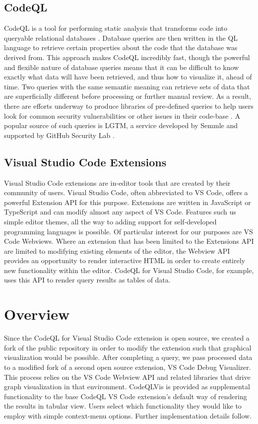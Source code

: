 \documentclass[sigplan,10pt,review]{acmart}
\begin{document}
\subsection{CodeQL}
CodeQL is a tool for performing static analysis that transforms code into queryable relational databases \cite{Semmle_CodeQL_About}. Database queries are then written in the QL language to retrieve certain properties about the code that the database was derived from. This approach makes CodeQL incredibly fast, though the powerful and flexible nature of database queries means that it can be difficult to know exactly what data will have been retrieved, and thus how to visualize it, ahead of time.
\newline
\indent Two queries with the same semantic meaning can retrieve sets of data that are superficially different before processing or further manual review. As a result, there are efforts underway to produce libraries of pre-defined queries to help users look for common security vulnerabilities or other issues in their code-base \cite{Semmle_LGTM}. A popular source of such queries is LGTM, a service developed by Semmle and supported by GitHub Security Lab \cite{GitHub_SecurtyLab_CodeQL}.

\subsection{Visual Studio Code Extensions}
Visual Studio Code extensions are in-editor tools that are created by their community of users. Visual Studio Code, often abbreviated to VS Code, offers a powerful Extension API for this purpose. Extensions are written in JavaScript or TypeScript and can modify almost any aspect of VS Code. Features such us simple editor themes, all the way to adding support for self-developed programming languages is possible.
\newline
\indent Of particular interest for our purposes are VS Code Webviews. Where an extension that has been limited to the Extensions API are limited to modifying existing elements of the editor, the Webview API provides an opportunity to render interactive HTML in order to create entirely new functionality within the editor. CodeQL for Visual Studio Code, for example, uses this API to render query results as tables of data.

\section{Overview}
Since the CodeQL for Visual Studio Code extension is open source, we created a fork of the public repository in order to modify the extension such that graphical visualization would be possible. After completing a query, we pass processed data to a modified fork of a second open source extension, VS Code Debug Visualizer. This process relies on the VS Code Webview API and related libraries that drive graph visualization in that environment.
\newline
\indent CodeQLVis is provided as supplemental functionality to the base CodeQL VS Code extension's default way of rendering the results in tabular view. Users select which functionality they would like to employ with simple context-menu options. Further implementation details follow.
\end{document}
